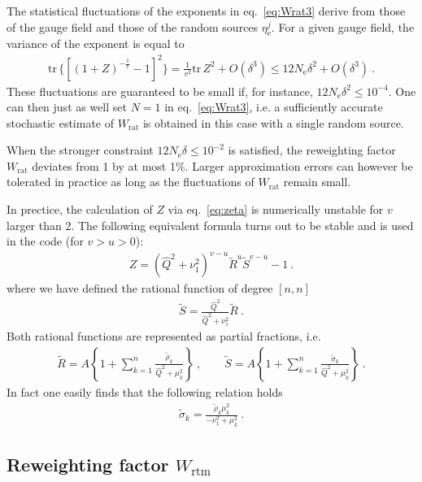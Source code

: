 \documentclass[11pt,fleqn]{article}
\newcommand{\tr}{\mathrm{tr}\,}
\newcommand{\R}{\tilde{R}}
\renewcommand{\S}{\tilde{S}}
\begin{document}
The statistical fluctuations of the exponents in eq.~\eqref{eq:Wrat3} derive from those of the gauge field and those of the random sources $\eta^j_\text{e}$. For a given gauge field, the variance of the exponent is equal to
\begin{gather}
   \tr \{ [ (1 + Z)^{-\frac{1}{v}} - 1 ]^2 \}
   =
   \frac{1}{v^2} \tr Z^2 + O(\delta^3)
   \le
   12 N_\text{e} \delta^2 + O(\delta^3) \ .
\end{gather}
These fluctuations are guaranteed to be small if, for instance, $12 N_\text{e} \delta^2 \le 10^{−4}$. One can then just as well set $N = 1$ in eq.~\eqref{eq:Wrat3}, i.e. a sufficiently accurate stochastic estimate of $W_\text{rat}$ is obtained in this case with a single random source.

When the stronger constraint $12 N_\text{e} \delta \le 10^{−2}$ is satisfied, the reweighting factor $W_\text{rat}$ deviates from 1 by at most 1\%. Larger approximation errors can however be tolerated in practice as long as the fluctuations of $W_\text{rat}$ remain small.

In prectice, the calculation of $Z$ via eq.~\eqref{eq:zeta} is numerically
unstable for $v$ larger than 2. The following equivalent formula turns out to be
stable and is used in the code (for $v>u>0$):
%
\begin{gather}
   Z = (\hat{Q}^2+\nu_1^2)^{v-u} \R^u \S^{v-u} - 1 \ .
   \label{eq:zeta-stable}
\end{gather}
%
where we have defined the rational function of degree $[n,n]$
%
\begin{gather}
   \S = \frac{\hat{Q}^2}{\hat{Q}^2+\nu_1^2} \R \ .
\end{gather}
%
Both rational functions are represented as partial fractions, i.e.
%
\begin{gather}
   \R = A \left\{ 1 + \sum_{k=1}^n \frac{\tilde{\rho}_k}{\hat{Q}^2+\mu_k^2} \right\}
   \ , \qquad
   \S = A \left\{ 1 + \sum_{k=1}^n \frac{\tilde{\sigma}_k}{\hat{Q}^2+\mu_k^2} \right\}
   \ .
\end{gather}
%
In fact one easily finds that the following relation holds
%
\begin{gather}
   \tilde{\sigma}_k = \frac{\tilde{\rho}_k \mu_k^2}{-\nu_1^2+\mu_k^2} \ .
\end{gather}


\subsection{Reweighting factor $W_\text{rtm}$}
\end{document}
